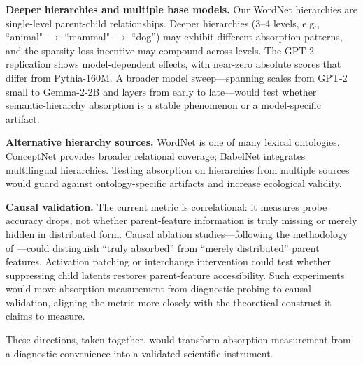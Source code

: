 \documentclass{article}
\begin{document}
\textbf{Deeper hierarchies and multiple base models.} Our WordNet hierarchies are single-level parent-child relationships. Deeper hierarchies (3--4 levels, e.g., ``animal" $\to$ ``mammal" $\to$ ``dog'') may exhibit different absorption patterns, and the sparsity-loss incentive may compound across levels. The GPT-2 replication shows model-dependent effects, with near-zero absolute scores that differ from Pythia-160M. A broader model sweep---spanning scales from GPT-2 small to Gemma-2-2B and layers from early to late---would test whether semantic-hierarchy absorption is a stable phenomenon or a model-specific artifact.

\textbf{Alternative hierarchy sources.} WordNet is one of many lexical ontologies. ConceptNet \citep{speer2017conceptnet} provides broader relational coverage; BabelNet \citep{navigli2012babelnet} integrates multilingual hierarchies. Testing absorption on hierarchies from multiple sources would guard against ontology-specific artifacts and increase ecological validity.

\textbf{Causal validation.} The current metric is correlational: it measures probe accuracy drops, not whether parent-feature information is truly missing or merely hidden in distributed form. Causal ablation studies---following the methodology of \citet{chanin2024feature}---could distinguish ``truly absorbed'' from ``merely distributed'' parent features. Activation patching or interchange intervention \citep{geiger2023causal} could test whether suppressing child latents restores parent-feature accessibility. Such experiments would move absorption measurement from diagnostic probing to causal validation, aligning the metric more closely with the theoretical construct it claims to measure.

These directions, taken together, would transform absorption measurement from a diagnostic convenience into a validated scientific instrument.



\end{document}
